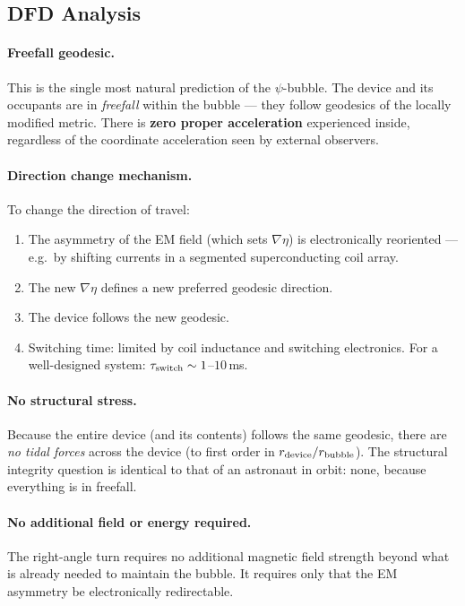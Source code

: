 \documentclass[12pt,a4paper]{article}
\begin{document}
\subsection{DFD Analysis}

\paragraph{Freefall geodesic.}
This is the single most natural prediction of the $\psi$-bubble.
The device and its occupants are in \emph{freefall} within the bubble ---
they follow geodesics of the locally modified metric.  There is
\textbf{zero proper acceleration} experienced inside, regardless of
the coordinate acceleration seen by external observers.

\paragraph{Direction change mechanism.}
To change the direction of travel:
\begin{enumerate}
\item The asymmetry of the EM field (which sets $\nabla\eta$) is
  electronically reoriented --- e.g.\ by shifting currents in a
  segmented superconducting coil array.
\item The new $\nabla\eta$ defines a new preferred geodesic direction.
\item The device follows the new geodesic.
\item Switching time: limited by coil inductance and switching electronics.
  For a well-designed system: $\tau_{\rm switch} \sim 1$--$10$\,ms.
\end{enumerate}

\paragraph{No structural stress.}
Because the entire device (and its contents) follows the same geodesic,
there are \emph{no tidal forces} across the device (to first order in
$r_{\rm device}/r_{\rm bubble}$).  The structural integrity question is
identical to that of an astronaut in orbit: none, because everything is
in freefall.

\paragraph{No additional field or energy required.}
The right-angle turn requires no additional magnetic field strength
beyond what is already needed to maintain the bubble.  It requires only
that the EM asymmetry be electronically redirectable.
\end{document}

